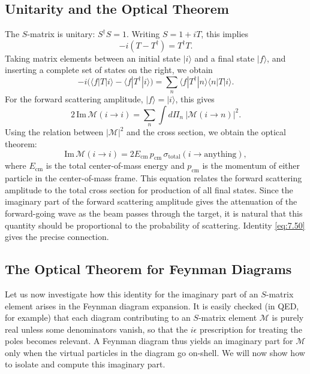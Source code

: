 \subsection{Unitarity and the Optical Theorem}

The $S$-matrix is unitary: $S^{\dagger}S = 1$.  Writing $S = 1+iT$, this
implies
\begin{equation}
  -i(T - T^{\dagger}) = T^{\dagger}T .
\end{equation}
Taking matrix elements between an initial state $|i\rangle$ and a final state
$|f\rangle$, and inserting a complete set of states on the right, we obtain
\begin{equation}
  -i\bigl( \langle f|T|i\rangle - \langle f|T^{\dagger}|i\rangle \bigr)
  = \sum_n \langle f|T^{\dagger}|n\rangle\langle n|T|i\rangle .
\end{equation}
For the forward scattering amplitude, $|f\rangle = |i\rangle$, this gives
\begin{equation}
  2\,\mathrm{Im}\,\mathcal{M}(i\to i)
  = \sum_n \int d\Pi_n\ |\mathcal{M}(i\to n)|^2 .
  \label{eq:7.49}
\end{equation}
Using the relation between $|\mathcal{M}|^2$ and the cross section, we obtain
the optical theorem:
\begin{equation}
  \mathrm{Im}\,\mathcal{M}(i\to i) = 2E_{\mathrm{cm}}\,p_{\mathrm{cm}}\,
    \sigma_{\mathrm{total}}(i\to\text{anything}),
  \label{eq:7.50}
\end{equation}
where $E_{\mathrm{cm}}$ is the total center-of-mass energy and $p_{\mathrm{cm}}$
is the momentum of either particle in the center-of-mass frame.  This equation
relates the forward scattering amplitude to the total cross section for
production of all final states.  Since the imaginary part of the forward
scattering amplitude gives the attenuation of the forward-going wave as the
beam passes through the target, it is natural that this quantity should be
proportional to the probability of scattering.  Identity \eqref{eq:7.50}
gives the precise connection.

\subsection{The Optical Theorem for Feynman Diagrams}

Let us now investigate how this identity for the imaginary part of an
$S$-matrix element arises in the Feynman diagram expansion.  It is easily
checked (in QED, for example) that each diagram contributing to an $S$-matrix
element $\mathcal{M}$ is purely real unless some denominators vanish, so that
the $i\epsilon$ prescription for treating the poles becomes relevant.  A
Feynman diagram thus yields an imaginary part for $\mathcal{M}$ only when the
virtual particles in the diagram go on-shell.  We will now show how to isolate
and compute this imaginary part.

